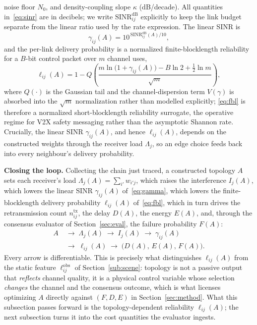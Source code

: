 \documentclass[journal]{IEEEtran}
\begin{document}
noise floor $N_0$, and density-coupling slope $\kappa$ (dB/decade). All quantities
in~\eqref{eq:sinr} are in decibels; we write $\mathrm{SINR}^{\mathrm{dB}}_{ij}$
explicitly to keep the link budget separate from the linear ratio used by the
rate expression. The linear SINR is
\begin{equation}
  \gamma_{ij}(A)=10^{\,\mathrm{SINR}^{\mathrm{dB}}_{ij}(A)/10},
  \label{eq:gamma}
\end{equation}
and the per-link delivery probability is a normalized finite-blocklength
\cite{PLACEHOLDER_finite_blocklength} reliability for a $B$-bit control packet
over $m$ channel uses,
\begin{equation}
  \ell_{ij}(A)=1-Q\!\left(\frac{m\ln\!\big(1+\gamma_{ij}(A)\big)-B\ln 2+\tfrac12\ln m}{\sqrt{m}}\right),
  \label{eq:fbl}
\end{equation}
where $Q(\cdot)$ is the Gaussian tail and the channel-dispersion term
$V(\gamma)$ is absorbed into the $\sqrt{m}$ normalization rather than modelled
explicitly; \eqref{eq:fbl} is therefore a normalized short-blocklength
reliability surrogate, the operative regime for V2X safety messaging rather than
the asymptotic Shannon rate. Crucially, the linear SINR $\gamma_{ij}(A)$, and
hence $\ell_{ij}(A)$, depends on the constructed weights through the receiver
load $\Lambda_j$, so an edge choice feeds back into every neighbour's delivery
probability.

\textbf{Closing the loop.}\label{sub:control} Collecting the chain just traced,
a constructed topology $A$ sets each receiver's load
$\Lambda_j(A)=\sum_{i'} w_{i'j}$, which raises the interference $I_j(A)$, which
lowers the linear SINR $\gamma_{ij}(A)$ of~\eqref{eq:gamma}, which lowers the
finite-blocklength delivery probability $\ell_{ij}(A)$ of~\eqref{eq:fbl}, which in
turn drives the retransmission count $n^{\mathrm{tx}}_{ij}$, the delay $D(A)$, the
energy $E(A)$, and, through the consensus evaluator of Section~\ref{sec:eval}, the
failure probability $F(A)$:
\begin{equation}
  \begin{aligned}
    A &\;\to\; \Lambda_j(A) \;\to\; I_j(A) \;\to\; \gamma_{ij}(A) \\
      &\;\to\; \ell_{ij}(A) \;\to\; \big(D(A),\,E(A),\,F(A)\big).
  \end{aligned}
  \label{eq:controlchain}
\end{equation}
Every arrow is differentiable. This is precisely what distinguishes
$\ell_{ij}(A)$ from the static feature $\ell_{ij}^{\mathrm{obs}}$ of
Section~\ref{sub:scene}: topology is not a passive output that \emph{reflects}
channel quality, it is a physical control variable whose selection \emph{changes}
the channel and the consensus outcome, which is what licenses optimizing $A$
directly against $(F,D,E)$ in Section~\ref{sec:method}. What this subsection
passes forward is the topology-dependent reliability $\ell_{ij}(A)$; the next
subsection turns it into the cost quantities the evaluator ingests.
\end{document}
